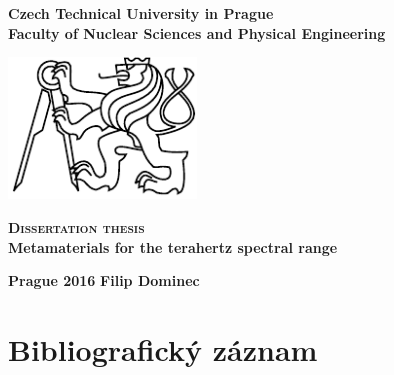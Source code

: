 \begin{center}
	\Large{\textbf{
Czech Technical University in Prague\\
Faculty of Nuclear Sciences and Physical Engineering\\ 
}}
 \vspace{3cm}

\includegraphics[width=5cm]{img/LogoCVUT}
\vspace{2cm}

\huge{\textbf{\scshape Dissertation thesis}}\\
\vspace{5mm}
{\LARGE\textbf{Metamaterials for the terahertz spectral range\\}}
\end{center}

\date{ } 			


 \vfill
\begin{minipage}{.99\textwidth}
\Large{\textbf{Prague 2016}} \hfill \Large{\textbf{Filip Dominec}}
\end{minipage}


\thispagestyle{empty} \newpage \setcounter{page}{1}

\chapter*{Bibliografický záznam}

